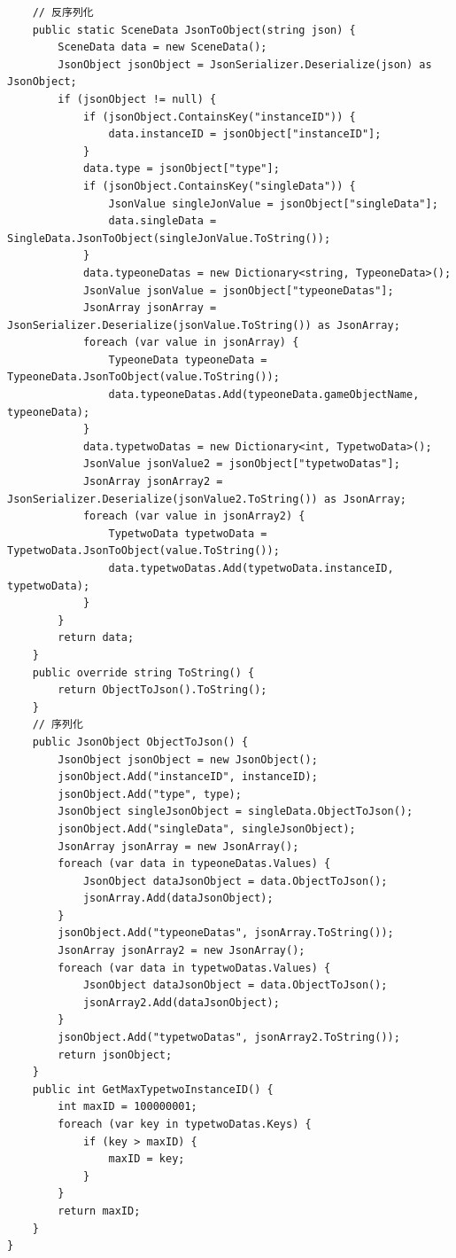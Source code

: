 \documentclass[9pt, b5paper]{article}
\begin{document}
\begin{verbatim}
    // 反序列化
    public static SceneData JsonToObject(string json) {
        SceneData data = new SceneData();
        JsonObject jsonObject = JsonSerializer.Deserialize(json) as JsonObject;
        if (jsonObject != null) {
            if (jsonObject.ContainsKey("instanceID")) {
                data.instanceID = jsonObject["instanceID"];
            }
            data.type = jsonObject["type"];
            if (jsonObject.ContainsKey("singleData")) {
                JsonValue singleJonValue = jsonObject["singleData"];
                data.singleData = SingleData.JsonToObject(singleJonValue.ToString());
            }
            data.typeoneDatas = new Dictionary<string, TypeoneData>();
            JsonValue jsonValue = jsonObject["typeoneDatas"];
            JsonArray jsonArray = JsonSerializer.Deserialize(jsonValue.ToString()) as JsonArray;
            foreach (var value in jsonArray) {
                TypeoneData typeoneData = TypeoneData.JsonToObject(value.ToString());
                data.typeoneDatas.Add(typeoneData.gameObjectName, typeoneData);
            }
            data.typetwoDatas = new Dictionary<int, TypetwoData>();
            JsonValue jsonValue2 = jsonObject["typetwoDatas"];
            JsonArray jsonArray2 = JsonSerializer.Deserialize(jsonValue2.ToString()) as JsonArray;
            foreach (var value in jsonArray2) {
                TypetwoData typetwoData = TypetwoData.JsonToObject(value.ToString());
                data.typetwoDatas.Add(typetwoData.instanceID, typetwoData);
            }
        }
        return data;
    }
    public override string ToString() {
        return ObjectToJson().ToString();
    }
    // 序列化
    public JsonObject ObjectToJson() {
        JsonObject jsonObject = new JsonObject();
        jsonObject.Add("instanceID", instanceID);
        jsonObject.Add("type", type);
        JsonObject singleJsonObject = singleData.ObjectToJson();
        jsonObject.Add("singleData", singleJsonObject);
        JsonArray jsonArray = new JsonArray();
        foreach (var data in typeoneDatas.Values) {
            JsonObject dataJsonObject = data.ObjectToJson();
            jsonArray.Add(dataJsonObject);
        }
        jsonObject.Add("typeoneDatas", jsonArray.ToString());
        JsonArray jsonArray2 = new JsonArray();
        foreach (var data in typetwoDatas.Values) {
            JsonObject dataJsonObject = data.ObjectToJson();
            jsonArray2.Add(dataJsonObject);
        }
        jsonObject.Add("typetwoDatas", jsonArray2.ToString());
        return jsonObject;
    }
    public int GetMaxTypetwoInstanceID() {
        int maxID = 100000001;
        foreach (var key in typetwoDatas.Keys) {
            if (key > maxID) {
                maxID = key;
            }
        }
        return maxID;
    }
}
\end{verbatim}
\end{document}
